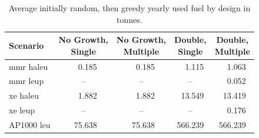   \begin{table}[H]
    \centering
    \caption{Average initially random, then greedy yearly used fuel by design in tonnes.}
    \label{tab:rand_greed_used_avg}
    \begin{tabular}{l c c c c}
       \toprule
       Scenario & \shortstack{No Growth,\\ Single} & \shortstack{No Growth,\\ Multiple} & \shortstack{Double,\\ Single} & \shortstack{Double,\\ Multiple}  \\
       \midrule
       \gls{mmr} \gls{haleu}   & \textcolor{white}{00}0.185    & \textcolor{white}{00}0.185   & \textcolor{white}{00}1.115    & \textcolor{white}{00}1.063    \\
       \gls{mmr} \gls{leup}    & --       & --      & --       & \textcolor{white}{00}0.052    \\
       \gls{xe} \gls{haleu}    & \textcolor{white}{00}1.882    & \textcolor{white}{00}1.882   & \textcolor{white}{0}13.549   & \textcolor{white}{0}13.419   \\
       \gls{xe} \gls{leup}     & --       & --      & --       & \textcolor{white}{00}0.176    \\
       AP1000 \gls{leu}        & \textcolor{white}{0}75.638   & \textcolor{white}{0}75.638  & 566.239  & 566.239  \\
       \bottomrule
    \end{tabular}
  \end{table}

